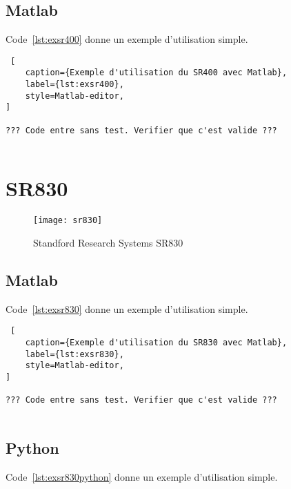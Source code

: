 \documentclass[11pt,francais]{book} %
\begin{document}
\subsection{Matlab}

Code~\ref{lst:exsr400} donne un exemple d'utilisation simple.

\begin{lstlisting} [
    caption={Exemple d'utilisation du SR400 avec Matlab},
    label={lst:exsr400},
    style=Matlab-editor,
]

??? Code entre sans test. Verifier que c'est valide ???
  
\end{lstlisting}


\section{SR830}

\begin{figure}[htbp]
\centering\texttt{[image: sr830]}
\caption{Standford Research Systems SR830}
\label{fig:sr830}
\end{figure}

\subsection{Matlab}

Code~\ref{lst:exsr830} donne un exemple d'utilisation simple.

\begin{lstlisting} [
    caption={Exemple d'utilisation du SR830 avec Matlab},
    label={lst:exsr830},
    style=Matlab-editor,
]

??? Code entre sans test. Verifier que c'est valide ???
  
\end{lstlisting}

\subsection{Python}

Code~\ref{lst:exsr830python} donne un exemple d'utilisation simple.
\end{document}
